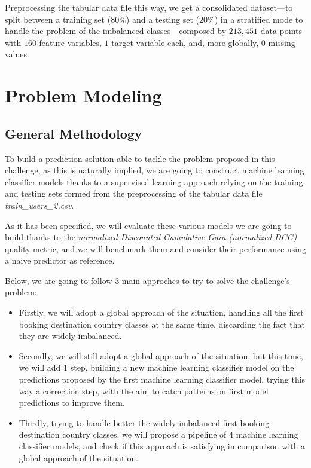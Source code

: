 \documentclass[twocolumn, switch]{article}
\begin{document}
Preprocessing the tabular data file this way, we get a consolidated dataset---to split between a training set ($80\%$) and a testing set ($20\%$) in a stratified mode to handle the problem of the imbalanced classes---composed by $213,451$ data points with $160$ feature variables, $1$ target variable each, and, more globally, $0$ missing values.


\section{Problem Modeling}

\subsection{General Methodology}

To build a prediction solution able to tackle the problem proposed in this challenge, as this is naturally implied, we are going to construct machine learning classifier models thanks to a supervised learning approach relying on the training and testing sets formed from the preprocessing of the tabular data file \textit{train\_users\_2.csv}.

As it has been specified, we will evaluate these various models we are going to build thanks to the \textit{normalized Discounted Cumulative Gain (normalized DCG)} quality metric, and we will benchmark them and consider their performance using a naive predictor as reference.

Below, we are going to follow $3$ main approches to try to solve the challenge's problem:
\begin{itemize}
\item Firstly, we will adopt a global approach of the situation, handling all the first booking destination country classes at the same time, discarding the fact that they are widely imbalanced.
\item Secondly, we will still adopt a global approach of the situation, but this time, we will add $1$ step, building a new machine learning classifier model on the predictions proposed by the first machine learning classifier model, trying this way a correction step, with the aim to catch patterns on first model predictions to improve them.
\item Thirdly, trying to handle better the widely imbalanced first booking destination country classes, we will propose a pipeline of $4$ machine learning classifier models, and check if this approach is satisfying in comparison with a global approach of the situation.
\end{itemize}
\end{document}
